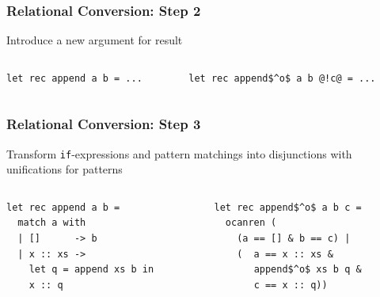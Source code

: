 \documentclass[xcolor=table]{beamer}
\begin{document}
\begin{frame}[fragile]
  \transwipe[direction=90]
  \frametitle{Relational Conversion: Step 2}
\begin{center}
Introduce a new argument for result
\end{center}

\begin{columns}
\begin{column}{0.5\textwidth}
\begin{lstlisting}
let rec append a b = ...
\end{lstlisting}
\end{column}
\begin{column}{0.5\textwidth}
\begin{lstlisting}
let rec append$^o$ a b @!c@ = ...
\end{lstlisting}
\end{column}
\end{columns}
\end{frame}

\begin{frame}[fragile]
  \transwipe[direction=90]
  \frametitle{Relational Conversion: Step 3}

\begin{center}
Transform \lstinline{if}-expressions and pattern matchings into disjunctions with unifications for patterns
\end{center}

\begin{columns}
\begin{column}{0.5\textwidth}
\begin{lstlisting}
let rec append a b =
  match a with
  | []      -> b
  | x :: xs ->
    let q = append xs b in
    x :: q
\end{lstlisting}
\end{column}
\begin{column}{0.5\textwidth}
\begin{lstlisting}
let rec append$^o$ a b c =
  ocanren (
    (a == [] & b == c) |
    (  a == x :: xs &
       append$^o$ xs b q &
       c == x :: q))
\end{lstlisting}
\end{column}
\end{columns}
\end{frame}
\end{document}
